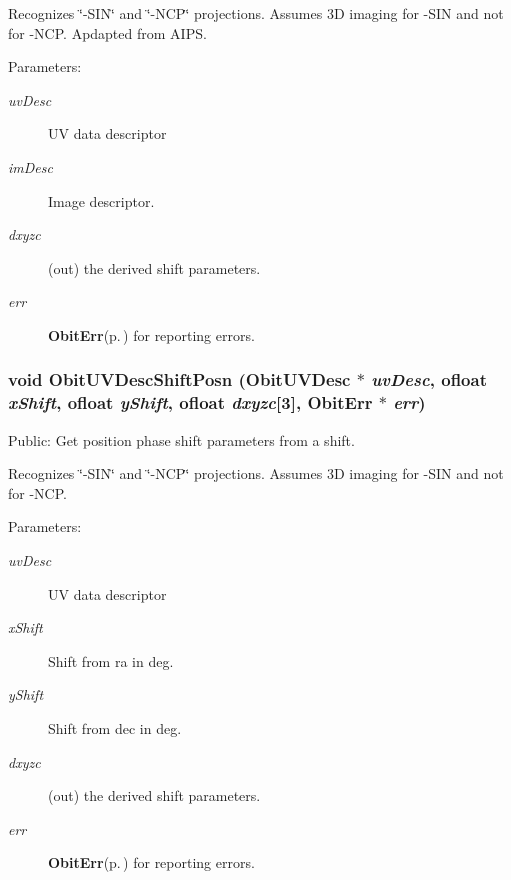 Recognizes \char`\"{}-SIN\char`\"{} and \char`\"{}-NCP\char`\"{} projections. Assumes 3D imaging for -SIN and not for -NCP. Apdapted from AIPS. \begin{Desc}
\item[Parameters:]
\begin{description}
\item[{\em uv\-Desc}]UV data descriptor \item[{\em im\-Desc}]Image descriptor. \item[{\em dxyzc}](out) the derived shift parameters. \item[{\em err}]{\bf Obit\-Err}{\rm (p.\,\pageref{structObitErr})} for reporting errors. \end{description}
\end{Desc}
\subsubsection{\setlength{\rightskip}{0pt plus 5cm}void Obit\-UVDesc\-Shift\-Posn ({\bf Obit\-UVDesc} $\ast$ {\em uv\-Desc}, {\bf ofloat} {\em x\-Shift}, {\bf ofloat} {\em y\-Shift}, {\bf ofloat} {\em dxyzc}[3], {\bf Obit\-Err} $\ast$ {\em err})}\label{ObitUVDesc_8h_a19}


Public: Get position phase shift parameters from a shift. 

Recognizes \char`\"{}-SIN\char`\"{} and \char`\"{}-NCP\char`\"{} projections. Assumes 3D imaging for -SIN and not for -NCP. \begin{Desc}
\item[Parameters:]
\begin{description}
\item[{\em uv\-Desc}]UV data descriptor \item[{\em x\-Shift}]Shift from ra in deg. \item[{\em y\-Shift}]Shift from dec in deg. \item[{\em dxyzc}](out) the derived shift parameters. \item[{\em err}]{\bf Obit\-Err}{\rm (p.\,\pageref{structObitErr})} for reporting errors. \end{description}
\end{Desc}
